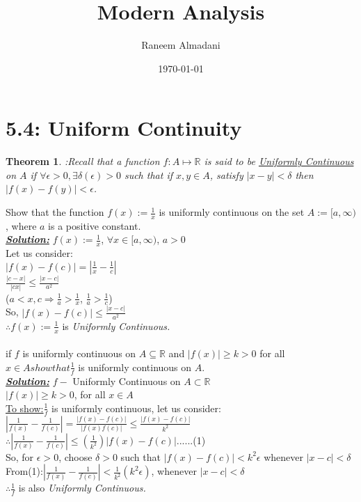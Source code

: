 \documentclass[12pt]{article}
\title{\Huge{Modern Analysis}}
\author{\Large{Raneem Almadani}}
\date{\today}
\newtheorem{theorem}{Theorem}
\begin{document}
\maketitle
\newpage
\section*{5.4: Uniform Continuity}
\begin{theorem}
:Recall that a function $f\colon A \mapsto\mathbb{R}$ is said to be \textit{\underline{\color{purple}Uniformly Continuous}} on $A$ if $\forall \epsilon>0,\exists \delta(\epsilon) >0 $ such that if $x,y \in A$, satisfy $|x-y|<\delta$ then $|f(x)-f(y)|<\epsilon$.
\end{theorem}
Show that the function $f(x):=\frac{1}{x}$ is uniformly continuous on the set $A:=[a,\infty)$, where $a$ is a positive constant.\\
\textbf{\underline{\textit{\color{purple}Solution:}}}
$f(x):=\frac{1}{x}$, $\forall x\in [a,\infty)$, $a>0$\\
Let us consider:\\
$|f(x)-f(c)|=\left |\frac{1}{x}-\frac{1}{c} \right |$\\
$\frac{|c-x|}{|cx|}\leq \frac{|x-c|}{a^2}$\\
($a<x,c\Rightarrow \frac{1}{a}>\frac{1}{x}$, $\frac{1}{a}>\frac{1}{c}$)\\
So, $|f(x)-f(c)|\leq \frac{|x-c|}{a^2}$\\
$\therefore f(x):=\frac{1}{x}$ is \textit{\color{purple}Uniformly Continuous.}\\
\\
{if $f$ is uniformly continuous on $A\subseteq \mathbb{R}$ and $|f(x)|\geq k>0$ for all $x\in A show that \frac{1}{f}$ is uniformly continuous on $A$.}\\
\textbf{\underline{\textit{\color{purple}Solution:}}}
$f-$ Uniformly Continuous on $A\subset\mathbb{R}$\\
$|f(x)|\geq k>0$, for all $x\in A$\\
\underline{To show:}$\frac{1}{f}$ is uniformly continuous, let us consider:\\
$\left |\frac{1}{f(x)}-\frac{1}{f(c)} \right |=\frac{|f(x)-f(c)|}{|f(x)f(c)|}\leq\frac{|f(x)-f(c)|}{k^2}$\\
$\therefore\left |\frac{1}{f(x)}-\frac{1}{f(c)}\right |\leq \left(\frac{1}{k^2}\right )|f(x)-f(c)|$......(1)\\
So, for $\epsilon>0$, choose $\delta>0$ such that $|f(x)-f(c)|<k^2\epsilon$ whenever $|x-c|<\delta$ 
From(1):$\left |\frac{1}{f(x)}-\frac{1}{f(c)} \right |<\frac{1}{k^2}(k^2\epsilon)$, whenever $|x-c|<\delta$\\
$\therefore \frac{1}{f}$ is also {\color{purple}\textit{Uniformly Continuous.}}
\end{document}

